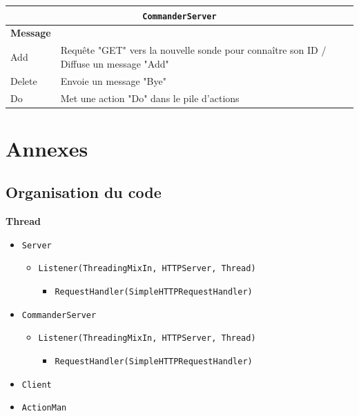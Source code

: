 \documentclass[a4paper,11pt]{article}
\newcommand{\cd}[1]{\texttt{#1}}
\begin{document}
\begin{center}
\begin{tabular}{|l|l|}
\hline
\multicolumn{2}{|c|}{\cd{CommanderServer}} \\
\hline
\textbf{Message} & \\
\hline
Add & Requête "GET" vers la nouvelle sonde pour connaître son ID / Diffuse un message "Add" \\
\hline
Delete & Envoie un message "Bye"\\
\hline
Do & Met une action "Do" dans le pile d'actions\\
\hline
\end{tabular}
\end{center}











\newpage
\section{Annexes}

\subsection{Organisation du code}

\textbf{Thread}
\begin{itemize}
\item \cd{Server}
	\begin{itemize}
	\item \cd{Listener(ThreadingMixIn, HTTPServer, Thread)}
		\begin{itemize}
		\item \cd{RequestHandler(SimpleHTTPRequestHandler)}
		\end{itemize}
	\end{itemize}

\item \cd{CommanderServer}
	\begin{itemize}
	\item \cd{Listener(ThreadingMixIn, HTTPServer, Thread)}
		\begin{itemize}
		\item \cd{RequestHandler(SimpleHTTPRequestHandler)}
		\end{itemize}
	\end{itemize}

\item \cd{Client}
\item \cd{ActionMan}
\end{itemize}
\end{document}
